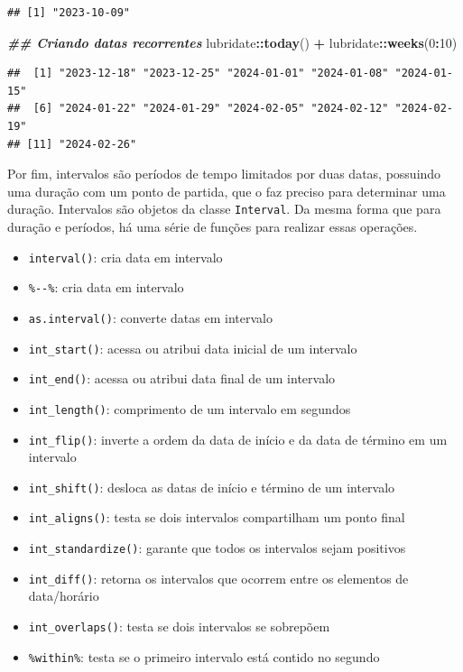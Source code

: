 \documentclass[
]{article}
\newenvironment{Shaded}{\begin{snugshade}}{\end{snugshade}}
\newcommand{\DecValTok}[1]{\textcolor[rgb]{0.00,0.00,0.81}{#1}}
\newcommand{\DocumentationTok}[1]{\textcolor[rgb]{0.56,0.35,0.01}{\textbf{\textit{#1}}}}
\newcommand{\FunctionTok}[1]{\textcolor[rgb]{0.13,0.29,0.53}{\textbf{#1}}}
\newcommand{\NormalTok}[1]{#1}
\newcommand{\SpecialCharTok}[1]{\textcolor[rgb]{0.81,0.36,0.00}{\textbf{#1}}}
\providecommand{\tightlist}{%
  \setlength{\itemsep}{0pt}\setlength{\parskip}{0pt}}
\begin{document}
\begin{verbatim}
## [1] "2023-10-09"
\end{verbatim}

\begin{Shaded}
\begin{Highlighting}[]
\DocumentationTok{\#\# Criando datas recorrentes}
\NormalTok{lubridate}\SpecialCharTok{::}\FunctionTok{today}\NormalTok{() }\SpecialCharTok{+}\NormalTok{ lubridate}\SpecialCharTok{::}\FunctionTok{weeks}\NormalTok{(}\DecValTok{0}\SpecialCharTok{:}\DecValTok{10}\NormalTok{)}
\end{Highlighting}
\end{Shaded}

\begin{verbatim}
##  [1] "2023-12-18" "2023-12-25" "2024-01-01" "2024-01-08" "2024-01-15"
##  [6] "2024-01-22" "2024-01-29" "2024-02-05" "2024-02-12" "2024-02-19"
## [11] "2024-02-26"
\end{verbatim}

Por fim, intervalos são períodos de tempo limitados por duas datas, possuindo uma duração com um ponto de partida, que o faz preciso para determinar uma duração. Intervalos são objetos da classe \texttt{Interval}. Da mesma forma que para duração e períodos, há uma série de funções para realizar essas operações.

\begin{itemize}
\tightlist
\item
  \texttt{interval()}: cria data em intervalo
\item
  \texttt{\%-\/-\%}: cria data em intervalo
\item
  \texttt{as.interval()}: converte datas em intervalo
\item
  \texttt{int\_start()}: acessa ou atribui data inicial de um intervalo
\item
  \texttt{int\_end()}: acessa ou atribui data final de um intervalo
\item
  \texttt{int\_length()}: comprimento de um intervalo em segundos
\item
  \texttt{int\_flip()}: inverte a ordem da data de início e da data de término em um intervalo
\item
  \texttt{int\_shift()}: desloca as datas de início e término de um intervalo
\item
  \texttt{int\_aligns()}: testa se dois intervalos compartilham um ponto final
\item
  \texttt{int\_standardize()}: garante que todos os intervalos sejam positivos
\item
  \texttt{int\_diff()}: retorna os intervalos que ocorrem entre os elementos de data/horário
\item
  \texttt{int\_overlaps()}: testa se dois intervalos se sobrepõem
\item
  \texttt{\%within\%}: testa se o primeiro intervalo está contido no segundo
\end{itemize}
\end{document}
